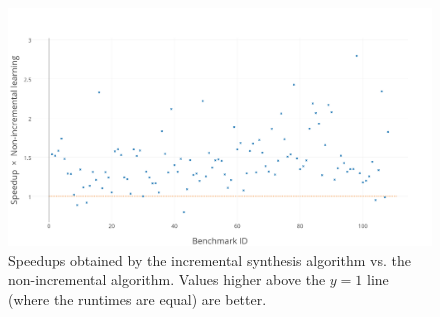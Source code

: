 \begin{figure}[t]
    \centering
    \includegraphics[width=0.99\linewidth]{figures/incremental-learning-performance}
    \caption{Speedups obtained by the incremental synthesis algorithm vs. the non-incremental algorithm.
        Values higher above the $y=1$ line (where the runtimes are equal) are better.}
    \label{fig:interactive:incremental:speedup}
\end{figure}
